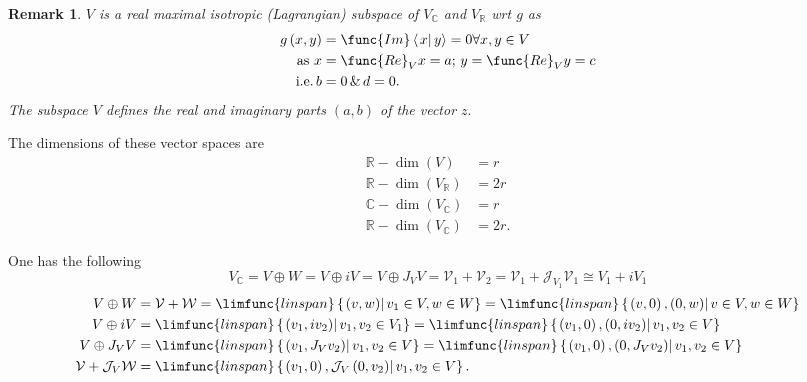 \documentclass[aps,preprint]{revtex4}
\newtheorem{remark}[theorem]{Remark}
\begin{document}
\begin{remark}
$V$ is a \emph{real} \emph{maximal} \emph{isotropic} (\emph{Lagrangian})
subspace of $V_{\mathbb{C}}$ and $V_{\mathbb{R}}$ wrt $g$ as 
\begin{align}
g\left( x,y\right) & =\func{Im}\left\langle \left. x\right\vert
y\right\rangle =0\forall x,y\in V \\
\text{as }x& =\func{Re}_{V}x=a;\,y=\func{Re}_{V}y=c \\
\text{i.e.\thinspace }b& =0\,\&\,d=0.
\end{align}%
The subspace $V$ defines the real and imaginary parts $\left( a,b\right) $
of the vector $z.$
\end{remark}

The dimensions of these vector spaces are%
\begin{align}
\mathbb{R-}\dim\left( V\right) & =r \\
\mathbb{R-}\dim\left( V_{\mathbb{R}}\right) & =2r \\
\mathbb{C-}\dim\left( V_{\mathbb{C}}\right) & =r \\
\mathbb{R-}\dim\left( V_{\mathbb{C}}\right) & =2r.
\end{align}

One has the following 
\begin{equation}
V_{\mathbb{C}}=V\oplus W=V\oplus iV=V\oplus J_{V}V=\mathcal{V}_{1}+\mathcal{V%
}_{2}=\mathcal{V}_{1}+\mathcal{J}_{V_{1}}\mathcal{V}_{1}\cong V_{1}+iV_{1}
\end{equation}%
\begin{align}
V\oplus W & =\mathcal{V}+\mathcal{W}=\limfunc{linspan}\left\{ \left. \left(
v,w\right) \right\vert v_{1}\in V,w\in W\right\} =\limfunc{linspan}\left\{
\left. \left( v,0\right) ,\left( 0,w\right) \right\vert v\in V,w\in W\right\}
\\
V\oplus iV & =\limfunc{linspan}\left\{ \left. \left( v_{1},iv_{2}\right)
\right\vert v_{1},v_{2}\in V_{1}\right\} =\limfunc{linspan}\left\{ \left.
\left( v_{1},0\right) ,\left( 0,iv_{2}\right) \right\vert v_{1},v_{2}\in
V\right\} \\
V\oplus J_{V}V & =\limfunc{linspan}\left\{ \left. \left(
v_{1},J_{V}v_{2}\right) \right\vert v_{1},v_{2}\in V\right\} =\limfunc{%
linspan}\left\{ \left. \left( v_{1},0\right) ,\left( 0,J_{V}v_{2}\right)
\right\vert v_{1},v_{2}\in V\right\} \\
\mathcal{V}+\mathcal{J}_{V}\mathcal{W} & =\limfunc{linspan}\left\{ \left.
\left( v_{1},0\right) ,\mathcal{J}_{V}\left( 0,v_{2}\right) \right\vert
v_{1},v_{2}\in V\right\} .
\end{align}
\end{document}
